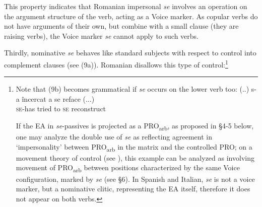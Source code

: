 \documentclass[output=paper]{langsci/langscibook}
\begin{document}
\ea%
    \label{ex:giurgea:8}
    \z
\z


This property indicates that Romanian impersonal \textit{se} involves an operation on the argument structure of the verb, acting as a Voice marker. As copular verbs do not have arguments of their own, but combine with a small clause (they are raising verbs), the Voice marker \textit{se} cannot apply to such verbs.

Thirdly, nominative \textit{se} behaves like standard subjects with respect to control into complement clauses (see (9a)). Romanian disallows this type of control:\footnote{Note that (9b) becomes grammatical if \textit{se} occurs on the lower verb too:
    \ea \gll  (..) s-a       încercat a   se  reface (...)\\
              {} \textsc{se-}has tried        to \textsc{se} reconstruct\\
    \z

    If the EA in \textit{se}{}-passives is projected as a PRO\textsubscript{arb}, as proposed in §4-5 below, one may analyze the double use of \textit{se} as reflecting agreement in ‘impersonality' between PRO\textsubscript{arb} in the matrix and the controlled PRO; on a movement theory of control (see \citealt{Hornstein1999}), this example can be analyzed as involving movement of PRO\textsubscript{arb} between positions characterized by the same Voice configuration, marked by \textit{se} (see §6). In Spanish and Italian, \textit{se} is not a voice marker, but a nominative clitic, representing the EA itself, therefore it does not appear on both verbs.}
\end{document}
